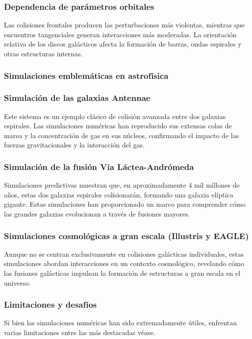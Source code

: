 \documentclass{article}
\begin{document}
\subsubsection*{Dependencia de parámetros orbitales}

Las colisiones frontales producen las perturbaciones más violentas, mientras que encuentros tangenciales generan interacciones más moderadas.
La orientación relativa de los discos galácticos afecta la formación de barras, ondas espirales y otras estructuras internas.

\subsubsection{Simulaciones emblemáticas en astrofísica}
\subsubsection*{Simulación de las galaxias Antennae}
Este sistema es un ejemplo clásico de colisión avanzada entre dos galaxias espirales. Las simulaciones numéricas han reproducido sus extensas colas de marea y la concentración de gas en sus núcleos, confirmando el impacto de las fuerzas gravitacionales y la interacción del gas.

\subsubsection*{Simulación de la fusión Vía Láctea-Andrómeda}
Simulaciones predictivas muestran que, en aproximadamente 4 mil millones de años, estas dos galaxias espirales colisionarán, formando una galaxia elíptica gigante. Estas simulaciones han proporcionado un marco para comprender cómo las grandes galaxias evolucionan a través de fusiones mayores.

\subsubsection*{Simulaciones cosmológicas a gran escala (Illustris y EAGLE)}
Aunque no se centran exclusivamente en colisiones galácticas individuales, estas simulaciones abordan interacciones en un contexto cosmológico, revelando cómo las fusiones galácticas impulsan la formación de estructuras a gran escala en el universo.

\subsubsection{Limitaciones y desafíos}
Si bien las simulaciones numéricas han sido extremadamente útiles, enfrentan varias limitaciones entre las más destacadas véase.
\end{document}
